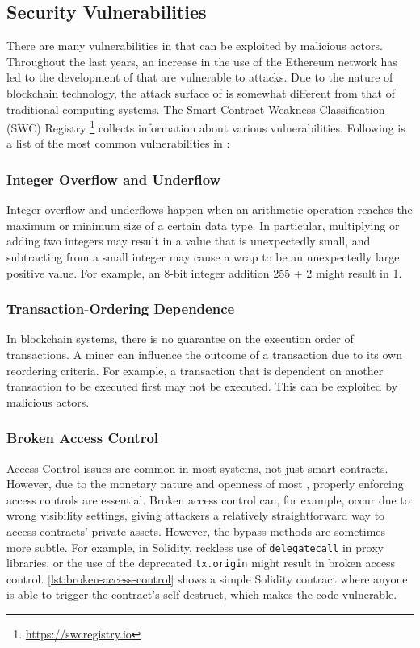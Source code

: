 \subsection{Security Vulnerabilities}
\label{sec:smart-contract-vulnerabilities}
There are many vulnerabilities in  that can be exploited by malicious actors. Throughout the last years, an increase in the use of the Ethereum network has led to the development of  that are vulnerable to attacks. Due to the nature of blockchain technology, the attack surface of  is somewhat different from that of traditional computing systems. The Smart Contract Weakness Classification (SWC) Registry \footnote{\url{https://swcregistry.io}} collects information about various vulnerabilities. Following is a list of the most common vulnerabilities in :

\subsubsection{Integer Overflow and Underflow}
Integer overflow and underflows happen when an arithmetic operation reaches the maximum or minimum size of a certain data type. In particular, multiplying or adding two integers may result in a value that is unexpectedly small, and subtracting from a small integer may cause a wrap to be an unexpectedly large positive value. For example, an 8-bit integer addition 255 + 2 might result in 1.

\subsubsection{Transaction-Ordering Dependence}
In blockchain systems, there is no guarantee on the execution order of transactions. A miner can influence the outcome of a transaction due to its own reordering criteria. For example, a transaction that is dependent on another transaction to be executed first may not be executed. This can be exploited by malicious actors. 

\subsubsection{Broken Access Control}
Access Control issues are common in most systems, not just smart contracts. However, due to the monetary nature and openness of most , properly enforcing access controls are essential. Broken access control can, for example, occur due to wrong visibility settings, giving attackers a relatively straightforward way to access contracts' private assets. However, the bypass methods are sometimes more subtle. For example, in Solidity, reckless use of \lstinline[language=Solidity]!delegatecall! in proxy libraries, or the use of the deprecated \lstinline[language=Solidity]!tx.origin! might result in broken access control. \cref{lst:broken-access-control} shows a simple Solidity contract where anyone is able to trigger the contract's self-destruct, which makes the code vulnerable.

